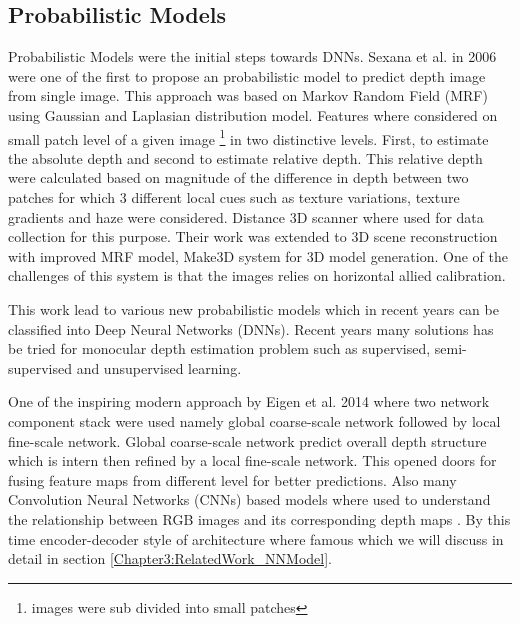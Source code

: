 \subsection{Probabilistic Models}
\label{Chapter3:RelatedWork_ProbabilisticModel}
Probabilistic Models were the initial steps towards DNNs. Sexana et al. \cite{saxena2006learning} in 2006 were one of the first to propose an probabilistic model to predict depth image from single image. This approach was based on Markov Random Field (MRF) using Gaussian and Laplasian distribution model. Features where considered on small patch level of a given image \footnote{images were sub divided into small patches} in two distinctive levels. First, to estimate the absolute depth and second to estimate relative depth. This relative depth were calculated based on magnitude of the difference in depth between two patches for which 3 different local cues such as texture variations, texture gradients and haze were considered. Distance 3D scanner where used for data collection for this purpose. Their work was extended to 3D scene reconstruction with improved MRF model, Make3D \cite{saxena2008make3d} system for 3D model generation. One of the challenges of this system is that the images relies on horizontal allied calibration. 

This work lead to various new probabilistic models which in recent years can be classified into Deep Neural Networks (DNNs). Recent years many solutions has be tried for monocular depth estimation problem such as supervised, semi-supervised and unsupervised learning.   

One of the inspiring modern approach by Eigen et al. 2014 \cite{eigen2014depth} where two network component stack were used namely global coarse-scale network followed by local fine-scale network. Global coarse-scale network predict overall depth structure which is intern then refined by a local fine-scale network. This opened doors for fusing feature maps from different level for better predictions.
Also many Convolution Neural Networks (CNNs) based models where used to understand the relationship between RGB images and its corresponding depth maps \cite{liu2015deep,laina2016deeper,Eigen_2015_ICCV,eigen2014depth, Alhashim2018}. By this time encoder-decoder style of architecture where famous\cite{Alhashim2018, hu2019revisiting} which we will discuss in detail in section \ref{Chapter3:RelatedWork_NNModel}. 

